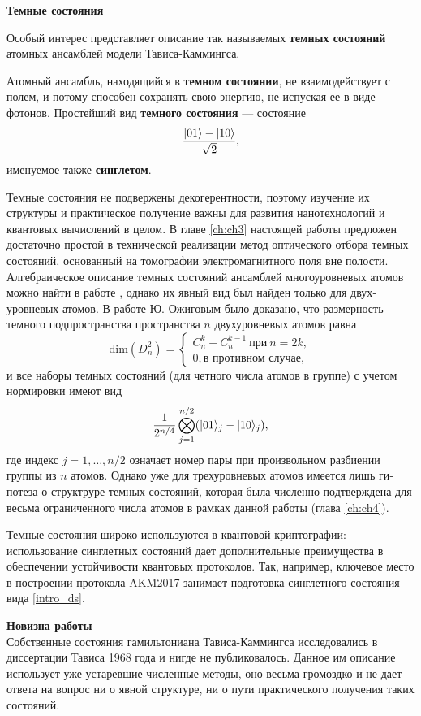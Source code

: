 \clearpage
\indent\textbf{Темные состояния}

Особый интерес представляет описание так называемых \textbf{темных состояний} \cite{dark_states_kok,dark_states_dimension} атомных ансамблей модели Тависа-Каммингса.

Атомный ансамбль, находящийся в \textbf{темном состоянии}, не взаимодействует с полем, и потому способен сохранять свою энергию, не испуская ее в виде фотонов. Простейший вид \textbf{темного состояния} --- состояние 
\begin{equation}\label{intro_ds}
	\frac{|01\rangle - |10\rangle}{\sqrt{2}},
\end{equation}
именуемое также \textbf{синглетом}.

Темные состояния не подвержены декогерентности, поэтому изучение их структуры и практическое получение важны для развития нанотехнологий и квантовых вычислений в целом. В главе \ref{ch:ch3} настоящей работы предложен до­статочно простой в технической реализации метод оптического отбора темных состояний, основанный на томографии электромагнитного поля вне полости. Алгебраическое описание темных состояний ансамблей многоуровневых атомов можно найти в работе \cite{dark_states_kok}, однако их явный вид был найден только для двух­уровневых атомов. В работе \cite{dark_states_dimension} Ю. Ожиговым было доказано, что размерность темного подпространства пространства $n$ двухуровневых атомов равна
\[
\mathrm{dim}(D_{n}^2) =	
\begin{cases}
	C_{n}^{k} - C_{n}^{k-1}~\text{при}~n = 2k, \\
	0, \text{в противном случае},
\end{cases}
\]
и все наборы темных состояний (для четного числа атомов в группе) с учетом нормировки имеют вид 
\[
\frac{1}{2^{n/4}}\bigotimes_{j=1}^{n/2}(|01\rangle_{j}-|10\rangle_{j}),
\]
где индекс $j = 1,\dots, n/2$ означает номер пары при произвольном разбиении группы из $n$ атомов. Однако уже для трехуровневых атомов имеется лишь ги­потеза о структруре темных состояний, которая была численно подтверждена для весьма ограниченного числа атомов в рамках данной работы (глава \ref{ch:ch4}).

Темные состояния широко используются в квантовой криптографии: использование синглетных состояний дает дополнительные преимущества в обеспечении устойчивости квантовых протоколов. Так, например, ключевое ме­сто в построении протокола AKM2017 \cite{akm2017} занимает подготовка синглетного состояния вида \eqref{intro_ds}.

\clearpage
\textbf{Новизна работы}\\
\indent Собственные состояния гамильтониана Тависа-Каммингса исследовались в диссертации Тависа \cite{tc_exact_solution} 1968 года и нигде не публиковалось. Данное им опи­сание использует уже устаревшие численные методы, оно весьма громоздко и не дает ответа на вопрос ни о явной структуре, ни о пути практического по­лучения таких состояний.


